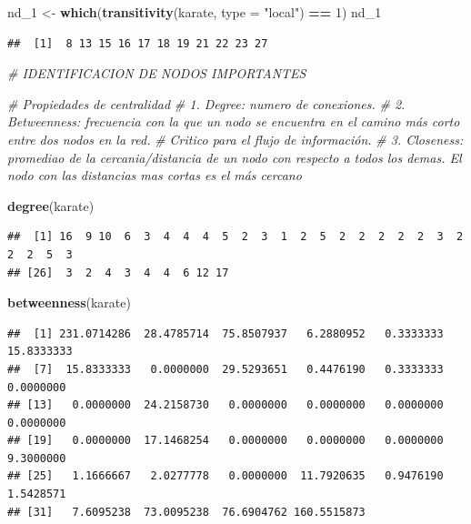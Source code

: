 \documentclass[
]{article}
\newenvironment{Shaded}{\begin{snugshade}}{\end{snugshade}}
\newcommand{\AttributeTok}[1]{\textcolor[rgb]{0.13,0.29,0.53}{#1}}
\newcommand{\CommentTok}[1]{\textcolor[rgb]{0.56,0.35,0.01}{\textit{#1}}}
\newcommand{\DecValTok}[1]{\textcolor[rgb]{0.00,0.00,0.81}{#1}}
\newcommand{\FunctionTok}[1]{\textcolor[rgb]{0.13,0.29,0.53}{\textbf{#1}}}
\newcommand{\NormalTok}[1]{#1}
\newcommand{\OtherTok}[1]{\textcolor[rgb]{0.56,0.35,0.01}{#1}}
\newcommand{\SpecialCharTok}[1]{\textcolor[rgb]{0.81,0.36,0.00}{\textbf{#1}}}
\newcommand{\StringTok}[1]{\textcolor[rgb]{0.31,0.60,0.02}{#1}}
\begin{document}
\begin{Shaded}
\begin{Highlighting}[]
\NormalTok{nd\_1 }\OtherTok{\textless{}{-}} \FunctionTok{which}\NormalTok{(}\FunctionTok{transitivity}\NormalTok{(karate, }\AttributeTok{type =} \StringTok{"local"}\NormalTok{) }\SpecialCharTok{==} \DecValTok{1}\NormalTok{)}
\NormalTok{nd\_1}
\end{Highlighting}
\end{Shaded}

\begin{verbatim}
##  [1]  8 13 15 16 17 18 19 21 22 23 27
\end{verbatim}

\begin{Shaded}
\begin{Highlighting}[]
\CommentTok{\# IDENTIFICACION DE NODOS IMPORTANTES}

\CommentTok{\# Propiedades de centralidad}
\CommentTok{\# 1. Degree: numero de conexiones.}
\CommentTok{\# 2. Betweenness: frecuencia con la que un nodo se encuentra en el camino más corto entre dos nodos en la red.}
\CommentTok{\# Critico para el flujo de información. }
\CommentTok{\# 3. Closeness: promediao de la cercania/distancia de un nodo con respecto a todos los demas. El nodo con las distancias mas cortas es el más cercano}

\FunctionTok{degree}\NormalTok{(karate)}
\end{Highlighting}
\end{Shaded}

\begin{verbatim}
##  [1] 16  9 10  6  3  4  4  4  5  2  3  1  2  5  2  2  2  2  2  3  2  2  2  5  3
## [26]  3  2  4  3  4  4  6 12 17
\end{verbatim}

\begin{Shaded}
\begin{Highlighting}[]
\FunctionTok{betweenness}\NormalTok{(karate)}
\end{Highlighting}
\end{Shaded}

\begin{verbatim}
##  [1] 231.0714286  28.4785714  75.8507937   6.2880952   0.3333333  15.8333333
##  [7]  15.8333333   0.0000000  29.5293651   0.4476190   0.3333333   0.0000000
## [13]   0.0000000  24.2158730   0.0000000   0.0000000   0.0000000   0.0000000
## [19]   0.0000000  17.1468254   0.0000000   0.0000000   0.0000000   9.3000000
## [25]   1.1666667   2.0277778   0.0000000  11.7920635   0.9476190   1.5428571
## [31]   7.6095238  73.0095238  76.6904762 160.5515873
\end{verbatim}
\end{document}
